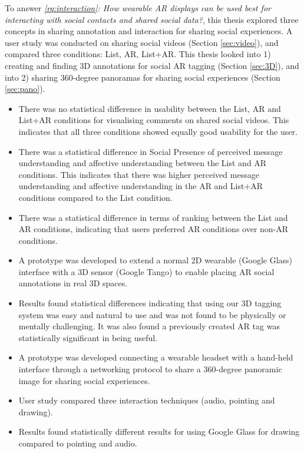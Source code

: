 \noindent
To answer \textit{\ref{rq:interaction}: How wearable AR displays can be used best for interacting with social contacts and shared social data?}, this thesis explored three concepts in sharing annotation and interaction for sharing social experiences. A user study was conducted on sharing social videos (Section \ref{sec:video}), and compared three conditions: List, AR, List+AR. This thesis looked into 1) creating and finding 3D annotations for social AR tagging (Section \ref{sec:3D}), and into 2) sharing 360-degree panoramas for sharing social experiences (Section \ref{sec:pano}). 

\begin{itemize}
    \item{There was no statistical difference in usability between the List, AR and List+AR conditions for visualising comments on shared social videos. This indicates that all three conditions showed equally good usability for the user.}
    \item{There was a statistical difference in Social Presence of perceived message understanding and affective understanding between the List and AR conditions. This indicates that there was higher perceived message understanding and affective understanding in the AR and List+AR conditions compared to the List condition.}
    \item{There was a statistical difference in terms of ranking between the List and AR conditions, indicating that users preferred AR conditions over non-AR conditions.}
    \item{A prototype was developed to extend a normal 2D wearable (Google Glass) interface with a 3D sensor (Google Tango) to enable placing AR social annotations in real 3D spaces.}
    \item{Results found statistical differences indicating that using our 3D tagging system was easy and natural to use and was not found to be physically or mentally challenging. It was also found a previously created AR tag was statistically significant in being useful.}
    \item{A prototype was developed connecting a wearable headset with a hand-held interface through a networking protocol to share a 360-degree panoramic image for sharing social experiences.}
    \item{User study compared three interaction techniques (audio, pointing and drawing).}
    \item{Results found statistically different results for using Google Glass for drawing compared to pointing and audio.}
\end{itemize}

